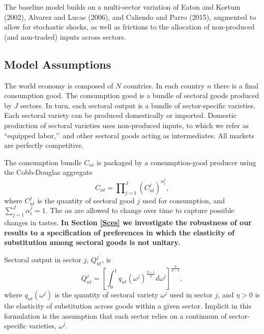 \documentclass[12pt]{article}
\begin{document}
The baseline model builds on a multi-sector variation of Eaton and Kortum
(2002), Alvarez and Lucas (2006), and Caliendo and Parro (2015), augmented
to allow for stochastic shocks, as well as frictions to the allocation of
non-produced (and non-traded) inputs across sectors.

\subsection{Model Assumptions}

The world economy is composed of $N$ countries. In each country $n$ there is
a final consumption good. The consumption good is a bundle of sectoral goods
produced by $J$ sectors. In turn, each sectoral output is a bundle of
sector-specific varieties. Each sectoral variety can be produced
domestically or imported. Domestic production of sectoral varieties uses
non-produced inputs, to which we refer as \textquotedblleft equipped
labor,\textquotedblright\ and other sectoral goods acting as intermediates.
All markets are perfectly competitive.

The consumption bundle $C_{nt}$ is packaged by a consumption-good producer
using the Cobb-Douglas aggregate 
\begin{equation}
C_{nt}=\prod\nolimits_{j=1}^{J}\left( C_{nt}^{j}\right) ^{\alpha _{t}^{j}},
\label{aggregate}
\end{equation}%
where $C_{nt}^{j}$ is the quantity of sectoral good $j$ used for
consumption, and $\sum_{j=1}^{J}\alpha _{t}^{j}=1$. The $\alpha $s are
allowed to change over time to capture possible changes in tastes. \textbf{%
In Section \ref{Sces} we investigate the robustness of our results to a
specification of preferences in which the elasticity of substitution among
sectoral goods is not unitary.}

Sectoral output in sector $j$, $Q_{nt}^{j}$, is 
\begin{equation}
Q_{nt}^{j}=\left[ \int_{0}^{1}q_{nt}(\omega ^{j})^{\frac{\eta -1}{\eta }%
}d\omega ^{j}\right] ^{\frac{\eta }{\eta -1}},  \label{sectoroutput}
\end{equation}%
where $q_{nt}(\omega ^{j})$ is the quantity of sectoral variety $\omega ^{j}$
used in sector $j$, and $\eta >0$ is the elasticity of substitution across
goods within a given sector. Implicit in this formulation is the assumption
that each sector relies on a continuum of sector-specific varieties, $\omega
^{j}$.
\end{document}
